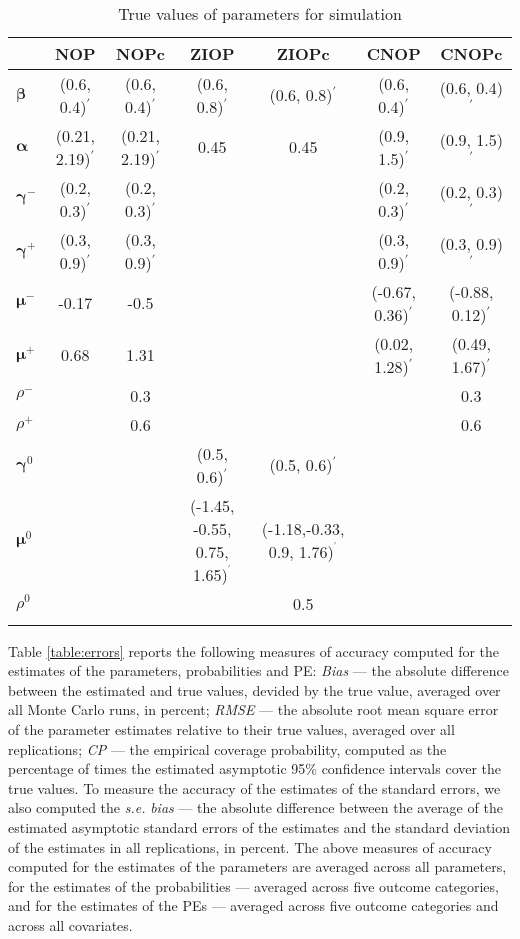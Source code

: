 \documentclass[letterpaper,fleqn,11pt]{article}
\begin{document}

\begin{table}[htbp]
\caption{True values of parameters for simulation}
\label{tab:params}{\tiny \ \centering
\begin{tabular}{lcccccc}
\toprule & NOP & NOPc & ZIOP & ZIOPc & CNOP & CNOPc \\ 
\midrule $\mathbf{\beta }$ & (0.6, 0.4)$^{\prime }$ & (0.6, 0.4)$^{\prime }$
& (0.6, 0.8)$^{\prime }$ & (0.6, 0.8)$^{\prime }$ & (0.6, 0.4)$^{\prime }$ & 
(0.6, 0.4)$^{\prime }$ \\ 
$\mathbf{\alpha }$ & (0.21, 2.19)$^{\prime }$ & (0.21, 2.19)$^{\prime }$ & 
0.45 & 0.45 & (0.9, 1.5)$^{\prime }$ & (0.9, 1.5)$^{\prime }$ \\ 
$\mathbf{\gamma }^{-}$ & (0.2, 0.3)$^{\prime }$ & (0.2, 0.3)$^{\prime }$ & 
&  & (0.2, 0.3)$^{\prime }$ & (0.2, 0.3)$^{\prime }$ \\ 
$\mathbf{\gamma }^{+}$ & (0.3, 0.9)$^{\prime }$ & (0.3, 0.9)$^{\prime }$ & 
&  & (0.3, 0.9)$^{\prime }$ & (0.3, 0.9)$^{\prime }$ \\ 
$\mathbf{\mu }^{-}$ & -0.17 & -0.5 &  &  & (-0.67, 0.36)$^{\prime }$ & 
(-0.88, 0.12)$^{\prime }$ \\ 
$\mathbf{\mu }^{+}$ & 0.68 & 1.31 &  &  & (0.02, 1.28)$^{\prime }$ & (0.49,
1.67)$^{\prime }$ \\ 
$\rho ^{-}$ &  & 0.3 &  &  &  & 0.3 \\ 
$\rho ^{+}$ &  & 0.6 &  &  &  & 0.6 \\ 
$\mathbf{\gamma }^{0}$ &  &  & (0.5, 0.6)$^{\prime }$ & (0.5, 0.6)$^{\prime }
$ &  &  \\ 
$\mathbf{\mu }^{0}$ &  &  & (-1.45, -0.55, 0.75, 1.65)$^{^{\prime }}$ & 
(-1.18,-0.33, 0.9, 1.76)$^{^{\prime }}$ &  &  \\ 
$\rho ^{0}$ &  &  &  & 0.5 &  &  \\ 
\bottomrule &  &  &  &  &  & 
\end{tabular}
}
\end{table}

Table \ref{table:errors} reports the following measures of accuracy computed
for the estimates of the parameters, probabilities and PE: \emph{Bias} ---
the absolute difference between the estimated and true values, devided by
the true value, averaged over all Monte Carlo runs, in percent; \emph{RMSE}
--- the absolute root mean square error of the parameter estimates relative
to their true values, averaged over all replications; \emph{CP} --- the
empirical coverage probability, computed as the percentage of times the
estimated asymptotic 95\% confidence intervals cover the true values. To
measure the accuracy of the estimates of the standard errors, we also
computed the \emph{s.e.} \emph{bias} --- the absolute difference between the
average of the estimated asymptotic standard errors of the estimates and the
standard deviation of the estimates in all replications, in percent. The
above measures of accuracy computed for the estimates of the parameters are
averaged across all parameters, for the estimates of the probabilities ---
averaged across five outcome categories, and for the estimates of the PEs
--- averaged across five outcome categories and across all covariates.
\end{document}
